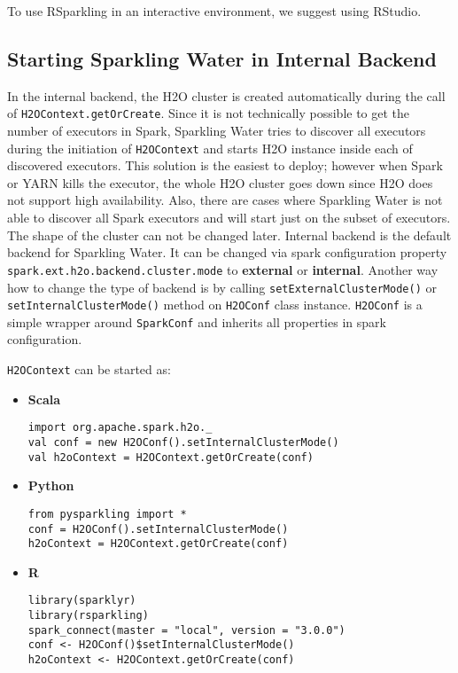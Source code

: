 To use RSparkling in an interactive environment, we suggest using RStudio.

\subsection{Starting Sparkling Water in Internal Backend}

In the internal backend, the H2O cluster is created automatically during the call of \texttt{H2OContext.getOrCreate}. Since
it is not technically possible to get the number of executors in Spark, Sparkling Water tries to discover all executors
during the initiation of \texttt{H2OContext} and starts H2O instance inside each of discovered executors. This solution
is the easiest to deploy; however when Spark or YARN kills the executor, the whole H2O cluster goes down since H2O
does not support high availability. Also, there are cases where Sparkling Water is not able to discover all Spark
executors and will start just on the subset of executors. The shape of the cluster can not be changed later.
Internal backend is the default backend for Sparkling Water. It can be changed via spark configuration property
\texttt{spark.ext.h2o.backend.cluster.mode} to \textbf{external} or \textbf{internal}. Another way how to change the
type of backend is by calling \texttt{setExternalClusterMode()} or \texttt{setInternalClusterMode()} method
on \texttt{H2OConf} class instance. \texttt{H2OConf} is a simple wrapper around \texttt{SparkConf} and inherits all
properties in spark configuration.

\texttt{H2OContext} can be started as:

\begin{itemize}
    \item \textbf{Scala} \begin{lstlisting}[style=Scala]
import org.apache.spark.h2o._
val conf = new H2OConf().setInternalClusterMode()
val h2oContext = H2OContext.getOrCreate(conf)
    \end{lstlisting}
    \item \textbf{Python} \begin{lstlisting}[style=Python]
from pysparkling import *
conf = H2OConf().setInternalClusterMode()
h2oContext = H2OContext.getOrCreate(conf)
    \end{lstlisting}
    \item \textbf{R} \begin{lstlisting}[style=R]
library(sparklyr)
library(rsparkling)
spark_connect(master = "local", version = "3.0.0")
conf <- H2OConf()$setInternalClusterMode()
h2oContext <- H2OContext.getOrCreate(conf)
    \end{lstlisting}
\end{itemize}

